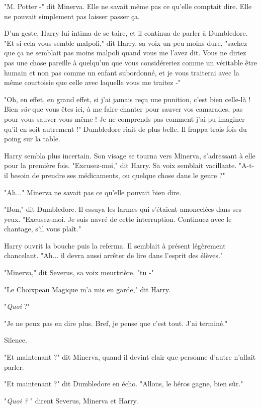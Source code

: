 "M. Potter -" dit Minerva. Elle ne savait même pas ce qu'elle comptait dire. Elle ne pouvait simplement pas laisser passer ça.

D'un geste, Harry lui intima de se taire, et il continua de parler à Dumbledore. "Et si cela vous semble malpoli," dit Harry, sa voix un peu moins dure, "sachez que ça ne semblait pas moins malpoli quand vous me l'avez dit. Vous ne diriez pas une chose pareille à quelqu'un que vous considéreriez comme un véritable être humain et non pas comme un enfant subordonné, et je vous traiterai avec la même courtoisie que celle avec laquelle vous me traitez -"

"Oh, en effet, en grand effet, si j'ai jamais reçu une punition, c'est bien celle-là ! Bien \emph{sûr}  que vous êtes ici, à me faire chanter pour sauver vos camarades, pas pour vous sauver vous-même ! Je ne comprends pas comment j'ai pu imaginer qu'il en soit autrement !" Dumbledore riait de plus belle. Il frappa trois fois du poing sur la table.

Harry sembla plus incertain. Son visage se tourna vers Minerva, s'adressant à elle pour la première fois. "Excusez-moi," dit Harry. Sa voix semblait vacillante. "A-t-il besoin de prendre ses médicaments, ou quelque chose dans le genre ?"

"Ah..." Minerva ne savait pas ce qu'elle pouvait bien dire.

"Bon," dit Dumbledore. Il essuya les larmes qui s'étaient amoncelées dans ses yeux. "Excusez-moi. Je suis navré de cette interruption. Continuez avec le chantage, s'il vous plaît."

Harry ouvrit la bouche puis la referma. Il semblait à présent légèrement chancelant. "Ah... il devra aussi arrêter de lire dans l'esprit des élèves."

"Minerva," dit Severus, sa voix meurtrière, "tu -"

"Le Choixpeau Magique m'a mis en garde," dit Harry.

"\emph{Quoi}  ?"

"Je ne peux pas en dire plus. Bref, je pense que c'est tout. J'ai terminé."

Silence.

"Et maintenant ?" dit Minerva, quand il devint clair que personne d'autre n'allait parler.

"Et maintenant ?" dit Dumbledore en écho. "Allons, le héros gagne, bien sûr."

"\emph{Quoi ?} " dirent Severus, Minerva et Harry.


